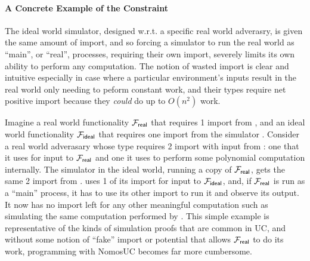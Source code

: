 \paragraph{A Concrete Example of the Constraint}
The ideal world simulator, designed w.r.t. a specific real world adverasry, is
given the same amount of import, and so forcing a simulator to run the real
world as ``main'', or ``real'', processes, requiring their own import, severely
limits its own ability to perform any computation.  The notion of wasted import
is clear and intuitive especially in case where a particular environment's
inputs result in the real world only needing to peform constant work, and their
types require net positive import because they \emph{could} do up to $O(n^2)$
work.

Imagine a real world functionality $\mathcal{F}_{\mathsf{real}}$ that requires 1 import from
\A, and an ideal world functionality $\mathcal{F}_{\mathsf{ideal}}$ that requires one import
from the simulator \Sim.  Consider a real world adverasary \A whose type
requires 2 import with input from \Z: one that it uses for input to
$\mathcal{F}_{\mathsf{real}}$ and one it uses to perform some polynomial computation
internally.  The simulator \Sim in the ideal world, running a copy of
$\mathcal{F}_{\mathsf{real}}$, gets the same 2 import from \Z.  \Sim uses 1 of its import for
input to $\mathcal{F}_{\mathsf{ideal}}$, and, if $\mathcal{F}_{\mathsf{real}}$ is run as a ``main'' process, it
has to use its other import to run it and observe its output.  It now has no
import left for any other meaningful computation such as simulating the same
computation performed by \A.  This simple example is representative of the
kinds of simulation proofs that are common in UC, and without some notion of
``fake'' import or potential that allows $\mathcal{F}_{\mathsf{real}}$ to do its work,
programming with NomosUC becomes far more cumbersome.

